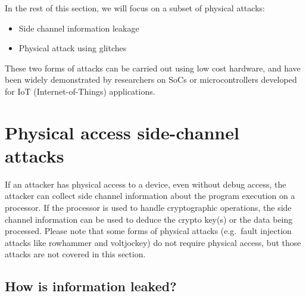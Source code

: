\documentclass[
  a4paper,
]{report}
\providecommand{\tightlist}{%
  \setlength{\itemsep}{0pt}\setlength{\parskip}{0pt}}
\begin{document}
In the rest of this section, we will focus on a subset of physical
attacks:

\begin{itemize}
\tightlist
\item
  Side channel information leakage
\item
  Physical attack using glitches
\end{itemize}

These two forms of attacks can be carried out using low cost hardware,
and have been widely demonstrated by researchers on SoCs or
microcontrollers developed for IoT (Internet-of-Things) applications.

\section{Physical access side-channel
attacks}\label{physical-access-side-channel-attacks-1}

If an attacker has physical access to a device, even without debug
access, the attacker can collect side channel information about the
program execution on a processor. If the processor is used to handle
cryptographic operations, the side channel information can be used to
deduce the crypto key(s) or the data being processed. Please note that
some forms of physical attacks (e.g.~fault injection attacks like
rowhammer and voltjockey) do not require physical access, but those
attacks are not covered in this section.

\subsection{How is information leaked?}\label{how-is-information-leaked}
\end{document}
